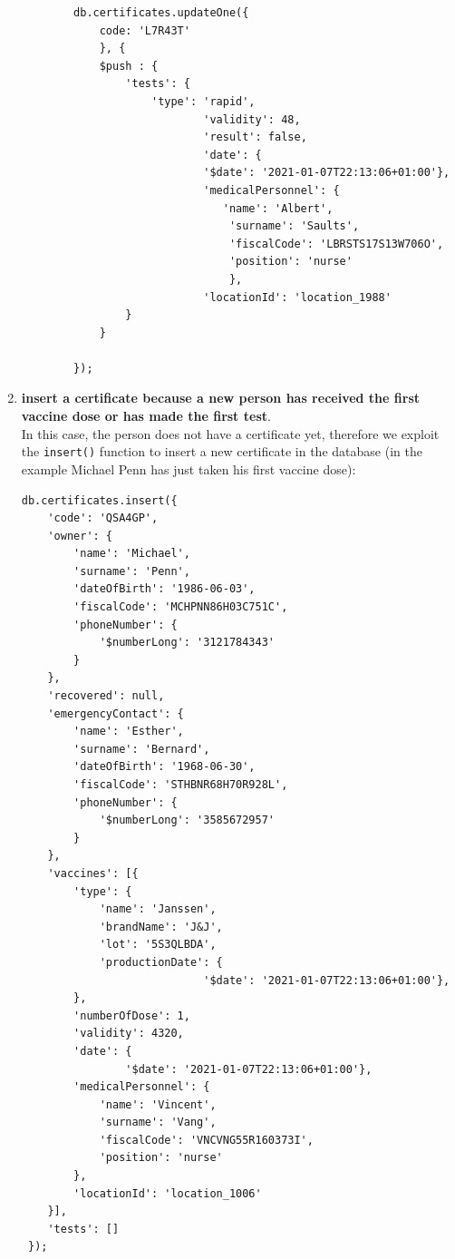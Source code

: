 \documentclass{article}
\begin{document}
\begin{enumerate}
    \begin{lstlisting}
        db.certificates.updateOne({
            code: 'L7R43T'
            }, {
            $push : {
                'tests': {
                    'type': 'rapid',
                            'validity': 48,
                            'result': false,
                            'date': {
                            '$date': '2021-01-07T22:13:06+01:00'},
                            'medicalPersonnel': {
                               'name': 'Albert',
                                'surname': 'Saults',
                                'fiscalCode': 'LBRSTS17S13W706O',
                                'position': 'nurse'
                                },
                            'locationId': 'location_1988'
                }
            }
        
        });
    \end{lstlisting}
    \item \textbf{insert a certificate because a new person has received the first vaccine dose or has made the first test}.\\
    In this case, the person does not have a certificate yet, therefore we exploit the \verb|insert()| function to insert a new certificate in the database (in the example Michael Penn has just taken his first vaccine dose):
    \begin{lstlisting}
db.certificates.insert({
    'code': 'QSA4GP',
    'owner': {
        'name': 'Michael',
        'surname': 'Penn',
        'dateOfBirth': '1986-06-03',
        'fiscalCode': 'MCHPNN86H03C751C',
        'phoneNumber': {
            '$numberLong': '3121784343'
        }
    },
    'recovered': null,
    'emergencyContact': {
        'name': 'Esther',
        'surname': 'Bernard',
        'dateOfBirth': '1968-06-30',
        'fiscalCode': 'STHBNR68H70R928L',
        'phoneNumber': {
            '$numberLong': '3585672957'
        }
    },
    'vaccines': [{
        'type': {
            'name': 'Janssen',
            'brandName': 'J&J',
            'lot': '5S3QLBDA',
            'productionDate': {
                            '$date': '2021-01-07T22:13:06+01:00'},
        },
        'numberOfDose': 1,
        'validity': 4320,
        'date': {
                '$date': '2021-01-07T22:13:06+01:00'},
        'medicalPersonnel': {
            'name': 'Vincent',
            'surname': 'Vang',
            'fiscalCode': 'VNCVNG55R160373I',
            'position': 'nurse'
        },
        'locationId': 'location_1006'
    }],
    'tests': []
 });
    \end{lstlisting}
\end{enumerate}
\end{document}

